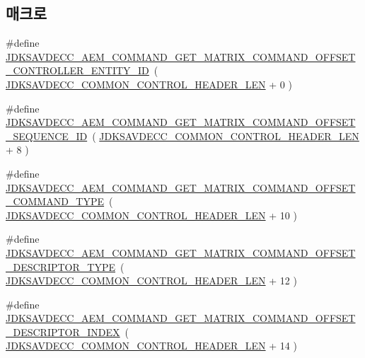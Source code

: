 \subsection*{매크로}
\begin{DoxyCompactItemize}
\item 
\#define \hyperlink{group__command__get__matrix_ga812156e654b9ff501ecc5f915f734eb9}{J\+D\+K\+S\+A\+V\+D\+E\+C\+C\+\_\+\+A\+E\+M\+\_\+\+C\+O\+M\+M\+A\+N\+D\+\_\+\+G\+E\+T\+\_\+\+M\+A\+T\+R\+I\+X\+\_\+\+C\+O\+M\+M\+A\+N\+D\+\_\+\+O\+F\+F\+S\+E\+T\+\_\+\+C\+O\+N\+T\+R\+O\+L\+L\+E\+R\+\_\+\+E\+N\+T\+I\+T\+Y\+\_\+\+ID}~( \hyperlink{group__jdksavdecc__avtp__common__control__header_gaae84052886fb1bb42f3bc5f85b741dff}{J\+D\+K\+S\+A\+V\+D\+E\+C\+C\+\_\+\+C\+O\+M\+M\+O\+N\+\_\+\+C\+O\+N\+T\+R\+O\+L\+\_\+\+H\+E\+A\+D\+E\+R\+\_\+\+L\+EN} + 0 )
\item 
\#define \hyperlink{group__command__get__matrix_ga86f446e12a647de05f10bfb5d5d079aa}{J\+D\+K\+S\+A\+V\+D\+E\+C\+C\+\_\+\+A\+E\+M\+\_\+\+C\+O\+M\+M\+A\+N\+D\+\_\+\+G\+E\+T\+\_\+\+M\+A\+T\+R\+I\+X\+\_\+\+C\+O\+M\+M\+A\+N\+D\+\_\+\+O\+F\+F\+S\+E\+T\+\_\+\+S\+E\+Q\+U\+E\+N\+C\+E\+\_\+\+ID}~( \hyperlink{group__jdksavdecc__avtp__common__control__header_gaae84052886fb1bb42f3bc5f85b741dff}{J\+D\+K\+S\+A\+V\+D\+E\+C\+C\+\_\+\+C\+O\+M\+M\+O\+N\+\_\+\+C\+O\+N\+T\+R\+O\+L\+\_\+\+H\+E\+A\+D\+E\+R\+\_\+\+L\+EN} + 8 )
\item 
\#define \hyperlink{group__command__get__matrix_gaa748dee5846b4cd55fecd1609505e0d1}{J\+D\+K\+S\+A\+V\+D\+E\+C\+C\+\_\+\+A\+E\+M\+\_\+\+C\+O\+M\+M\+A\+N\+D\+\_\+\+G\+E\+T\+\_\+\+M\+A\+T\+R\+I\+X\+\_\+\+C\+O\+M\+M\+A\+N\+D\+\_\+\+O\+F\+F\+S\+E\+T\+\_\+\+C\+O\+M\+M\+A\+N\+D\+\_\+\+T\+Y\+PE}~( \hyperlink{group__jdksavdecc__avtp__common__control__header_gaae84052886fb1bb42f3bc5f85b741dff}{J\+D\+K\+S\+A\+V\+D\+E\+C\+C\+\_\+\+C\+O\+M\+M\+O\+N\+\_\+\+C\+O\+N\+T\+R\+O\+L\+\_\+\+H\+E\+A\+D\+E\+R\+\_\+\+L\+EN} + 10 )
\item 
\#define \hyperlink{group__command__get__matrix_ga35cb9cda25238f6143b6fea0d8f0d553}{J\+D\+K\+S\+A\+V\+D\+E\+C\+C\+\_\+\+A\+E\+M\+\_\+\+C\+O\+M\+M\+A\+N\+D\+\_\+\+G\+E\+T\+\_\+\+M\+A\+T\+R\+I\+X\+\_\+\+C\+O\+M\+M\+A\+N\+D\+\_\+\+O\+F\+F\+S\+E\+T\+\_\+\+D\+E\+S\+C\+R\+I\+P\+T\+O\+R\+\_\+\+T\+Y\+PE}~( \hyperlink{group__jdksavdecc__avtp__common__control__header_gaae84052886fb1bb42f3bc5f85b741dff}{J\+D\+K\+S\+A\+V\+D\+E\+C\+C\+\_\+\+C\+O\+M\+M\+O\+N\+\_\+\+C\+O\+N\+T\+R\+O\+L\+\_\+\+H\+E\+A\+D\+E\+R\+\_\+\+L\+EN} + 12 )
\item 
\#define \hyperlink{group__command__get__matrix_ga07d69e308ef14c7d4663a7c43e645173}{J\+D\+K\+S\+A\+V\+D\+E\+C\+C\+\_\+\+A\+E\+M\+\_\+\+C\+O\+M\+M\+A\+N\+D\+\_\+\+G\+E\+T\+\_\+\+M\+A\+T\+R\+I\+X\+\_\+\+C\+O\+M\+M\+A\+N\+D\+\_\+\+O\+F\+F\+S\+E\+T\+\_\+\+D\+E\+S\+C\+R\+I\+P\+T\+O\+R\+\_\+\+I\+N\+D\+EX}~( \hyperlink{group__jdksavdecc__avtp__common__control__header_gaae84052886fb1bb42f3bc5f85b741dff}{J\+D\+K\+S\+A\+V\+D\+E\+C\+C\+\_\+\+C\+O\+M\+M\+O\+N\+\_\+\+C\+O\+N\+T\+R\+O\+L\+\_\+\+H\+E\+A\+D\+E\+R\+\_\+\+L\+EN} + 14 )

\end{DoxyCompactItemize}
